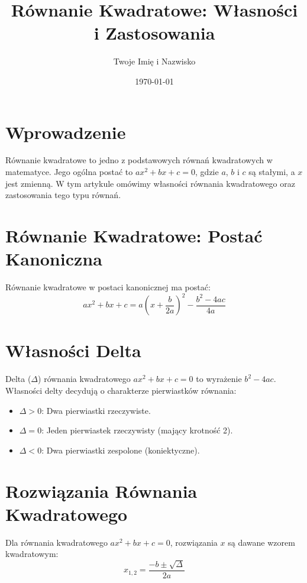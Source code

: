 \documentclass[12pt]{article}
\title{Równanie Kwadratowe: Własności i Zastosowania}
\author{Twoje Imię i Nazwisko}
\date{\today}
\begin{document}
\maketitle

\section{Wprowadzenie}
Równanie kwadratowe to jedno z podstawowych równań kwadratowych w matematyce. Jego ogólna postać to $ax^2 + bx + c = 0$, gdzie $a$, $b$ i $c$ są stałymi, a $x$ jest zmienną. W tym artykule omówimy własności równania kwadratowego oraz zastosowania tego typu równań.

\section{Równanie Kwadratowe: Postać Kanoniczna}
\begin{definition}
Równanie kwadratowe w postaci kanonicznej ma postać:
\[
ax^2 + bx + c = a\left(x + \frac{b}{2a}\right)^2 - \frac{b^2 - 4ac}{4a}
\]
\end{definition}

\section{Własności Delta}
\begin{definition}
Delta ($\Delta$) równania kwadratowego $ax^2 + bx + c = 0$ to wyrażenie $b^2 - 4ac$. Własności delty decydują o charakterze pierwiastków równania:
\begin{itemize}
  \item $\Delta > 0$: Dwa pierwiastki rzeczywiste.
  \item $\Delta = 0$: Jeden pierwiastek rzeczywisty (mający krotność 2).
  \item $\Delta < 0$: Dwa pierwiastki zespolone (koniektyczne).
\end{itemize}
\end{definition}

\section{Rozwiązania Równania Kwadratowego}
\begin{theorem}
Dla równania kwadratowego $ax^2 + bx + c = 0$, rozwiązania $x$ są dawane wzorem kwadratowym:
\[
x_{1,2} = \frac{-b \pm \sqrt{\Delta}}{2a}
\]
\end{theorem}
\end{document}
